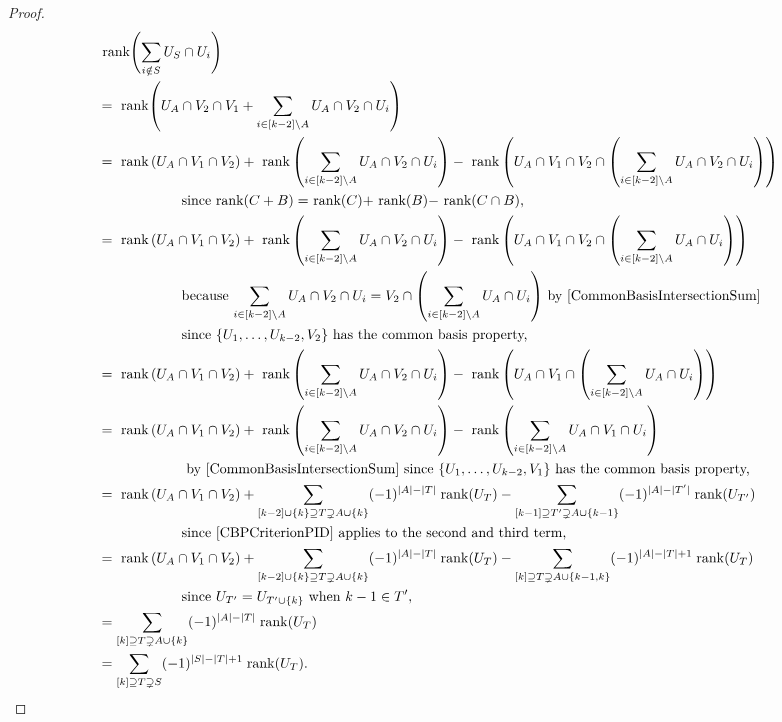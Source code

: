 \documentclass[a4paper]{amsart}
\numberwithin{theoremcounter}{section}
\theoremstyle{definition}
\theoremstyle{remark}
\newcommand{\mr}[1]{{\rm #1}}
\newcommand{\rank}{\mr{rank}}
\begin{document}
\begin{proof}
   \begin{align*} &  \text{ rank$\left(\sum_{i \notin S} U_S \cap U_i \right)$} \\ 
&=  \text{ rank$\left(U_A   \cap V_2 \cap V_1 +  \sum_{i \in [k-2]\setminus A} U_A  \cap V_2  \cap U_i \right)$} \\
& =  \text{ rank}\left(U_A  \cap V_1 \cap V_2 \right) +  \text{ rank}\left(\sum_{i \in [k-2]\setminus A} U_A  \cap V_2 \cap U_i \right) - \text{ rank} \left( U_A  \cap V_1 \cap V_2 \cap \left(\sum_{i \in [k-2]\setminus A} U_A  \cap V_2 \cap U_i \right)\right)   \\
& \qquad \qquad \qquad  \text{since rank$(C+ B)=$ rank$(C) + $ rank$(B) - $ rank$(C \cap B)$, } \\ 
& =  \text{ rank}\left(U_A  \cap V_1 \cap V_2 \right) +  \text{ rank}\left(\sum_{i \in [k-2]\setminus A} U_A  \cap V_2 \cap U_i \right) - \text{ rank} \left( U_A  \cap V_1\cap V_2  \cap \left(\sum_{i \in [k-2]\setminus A} U_A    \cap U_i \right)\right)   \\
& \qquad \qquad \qquad  \text{because $\sum_{i \in [k-2]\setminus A} U_A  \cap V_2 \cap U_i  =  V_2 \cap \left( \sum_{i \in [k-2]\setminus A} U_A \cap U_i \right)$ by \autoref{CommonBasisIntersectionSum} } \\  & \qquad \qquad \qquad  \text{since $\{U_1, \dots, U_{k-2}, V_2\}$ has the common basis property, } \\ 
& =  \text{ rank}\left(U_A  \cap V_1 \cap V_2 \right) +  \text{ rank}\left(\sum_{i \in [k-2]\setminus A} U_A  \cap V_2 \cap U_i \right) - \text{ rank} \left( U_A  \cap V_1   \cap \left(\sum_{i \in [k-2]\setminus A} U_A    \cap U_i \right)\right)   \\
& =  \text{ rank}\left(U_A  \cap V_1 \cap V_2 \right) +  \text{ rank}\left(\sum_{i \in [k-2]\setminus A} U_A  \cap V_2 \cap U_i \right) - \text{ rank} \left(\sum_{i \in [k-2]\setminus A} U_A    \cap V_1 \cap U_i \right)   \\
& \qquad \qquad \qquad  \text{ by \autoref{CommonBasisIntersectionSum} since $\{U_1, \dots, U_{k-2}, V_1\}$ has the common basis property, } \\ 
& =  \text{ rank}\left(U_A  \cap V_1 \cap V_2 \right)  +  \sum_{[k-2]\cup\{k\} \supseteq T\supsetneq A \cup \{k\}} (-1)^{|A|-|T|} \; \rank(U_T) -  \sum_{[k-1] \supseteq T'\supsetneq A \cup\{k-1\}} (-1)^{|A|-|T'| } \; \rank(U_{T'})\\
& \qquad \qquad \qquad  \text{since \autoref{CBPCriterionPID} applies to the second and third term,} \\ 
& =  \text{ rank}\left(U_A  \cap V_1 \cap V_2 \right)  +  \sum_{[k-2]\cup\{k\} \supseteq T\supsetneq A \cup \{k\}} (-1)^{|A|-|T|} \; \rank(U_T) -  \sum_{[k] \supseteq T\supsetneq A \cup\{k-1, k\}} (-1)^{|A|-|T|+1 } \; \rank(U_T)\\
& \qquad \qquad \qquad  \text{since $U_{T'} = U_{T'\cup \{k\}}$ when $k-1 \in T'$, } \\ 
& =  \sum_{[k] \supseteq T\supsetneq A \cup \{k\}} (-1)^{|A|-|T|} \; \rank(U_T) \\
& =  \sum_{[k] \supseteq T\supsetneq S} (-1)^{|S|-|T|+1} \; \rank(U_T).  
  \end{align*} 
  

\end{proof}
\end{document}
